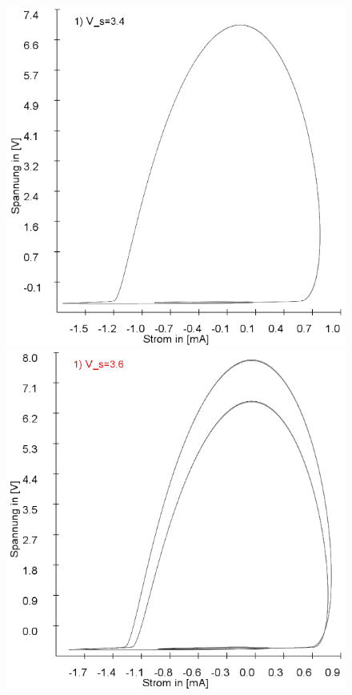 \documentclass[11,5pt, twoside]{article}
\begin{document}
\begin{figure}[!htbp]
\centering
\includegraphics[scale=0.20]{schwing-euler-nach2500k-weitere100k-3,4V}
\includegraphics[scale=0.20]{schwing-euler-nach2500k-weitere100k-3,6V}

\end{figure}
\end{document}
